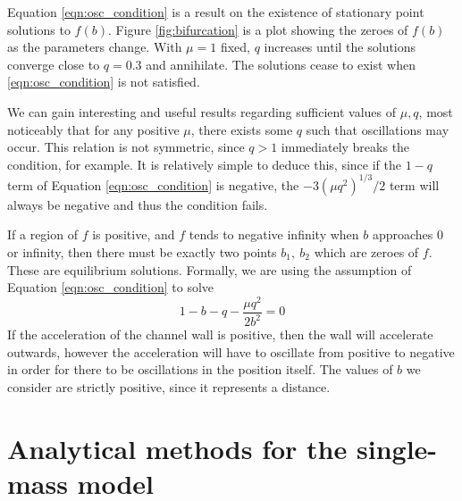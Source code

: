 Equation \ref{eqn:osc_condition} is a result on the existence of stationary point solutions to $f(b)$.
Figure \ref{fig:bifurcation} is a plot showing the zeroes of $f(b)$ as the parameters change.
With $\mu=1$ fixed, $q$ increases until the solutions converge close to $q=0.3$ and annihilate. %
The solutions cease to exist when \ref{eqn:osc_condition} is not satisfied.

We can gain interesting and useful results regarding sufficient values of $\mu, q$,
most noticeably that for any positive $\mu$, there exists some $q$ such that oscillations may occur.
This relation is not symmetric, since $q>1$ immediately breaks the condition, for example.
It is relatively simple to deduce this, since if the $1-q$ term of Equation \ref{eqn:osc_condition} is negative,
the $-3(\mu q^2)^{1/3}/2$ term will always be negative and thus the condition fails.

If a region of $f$ is positive, and $f$ tends to negative infinity when $b$ approaches $0$ or infinity,
then there must be exactly two points $b_1,~b_2$ which are zeroes of $f$.
These are equilibrium solutions.
Formally, we are using the assumption of Equation \ref{eqn:osc_condition} to solve
\begin{equation}
    1 - b - q - \frac{\mu q^2}{2b^2} = 0
\end{equation}
If the acceleration of the channel wall is positive,
then the wall will accelerate outwards,
however the acceleration will have to oscillate from positive to negative in order for there to be oscillations in the position itself.
The values of $b$ we consider are strictly positive,
since it represents a distance.


\section{Analytical methods for the single-mass model}


